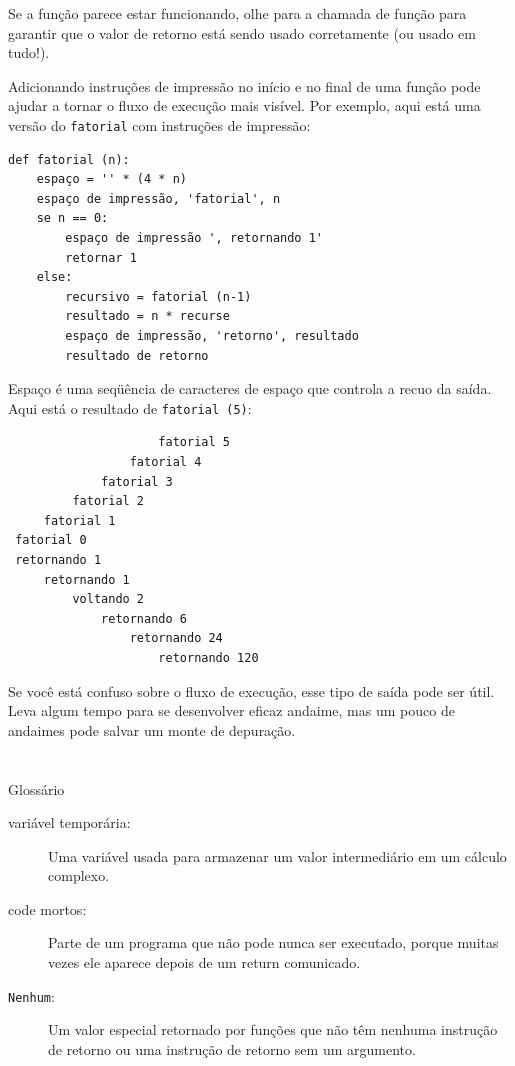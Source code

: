 \documentclass[10pt]{book}
\begin{document}
{{Se a função parece estar funcionando, olhe para a chamada de função
para garantir que o valor de retorno está sendo usado corretamente (ou usado
em tudo!).

Adicionando instruções de impressão no início e no final de uma função
pode ajudar a tornar o fluxo de execução mais visível.
Por exemplo, aqui está uma versão do {\tt fatorial} com
instruções de impressão:

\begin{verbatim}
def fatorial (n):
    espaço = '' * (4 * n)
    espaço de impressão, 'fatorial', n
    se n == 0:
        espaço de impressão ', retornando 1'
        retornar 1
    else:
        recursivo = fatorial (n-1)
        resultado = n * recurse
        espaço de impressão, 'retorno', resultado
        resultado de retorno
\end{verbatim}
%
{Espaço \tt} é uma seqüência de caracteres de espaço que controla a
recuo da saída. Aqui está o resultado de {\tt fatorial (5)}:

\begin{verbatim}
                     fatorial 5
                 fatorial 4
             fatorial 3
         fatorial 2
     fatorial 1
 fatorial 0
 retornando 1
     retornando 1
         voltando 2
             retornando 6
                 retornando 24
                     retornando 120
\end{verbatim}
%
Se você está confuso sobre o fluxo de execução, esse tipo de
saída pode ser útil. Leva algum tempo para se desenvolver eficaz
andaime, mas um pouco de andaimes pode salvar um monte de depuração.


\section{} Glossário

\begin{description}

\item[variável temporária:] Uma variável usada para armazenar um valor intermediário em
um cálculo complexo.

\item[code mortos:] Parte de um programa que não pode nunca ser executado, porque muitas vezes
ele aparece depois de um {return \tt} comunicado.

\item[{\tt Nenhum}:] Um valor especial retornado por funções que
não têm nenhuma instrução de retorno ou uma instrução de retorno sem um argumento.


\end{description}}}
\end{document}
